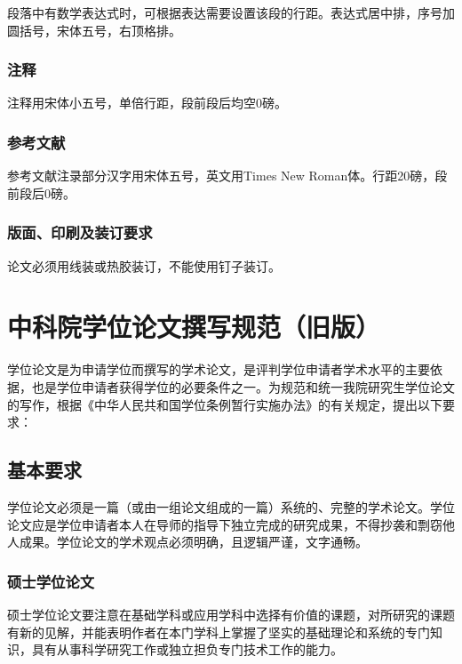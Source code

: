 \documentclass[a4paper,12pt,oneside,openany]{book}
\begin{document}
\begin{CJK}{UTF8}{hei}
段落中有数学表达式时，可根据表达需要设置该段的行距。表达式居中排，序号加圆括号，宋体五号，右顶格排。 


\subsection{注释}

注释用宋体小五号，单倍行距，段前段后均空0磅。


\subsection{参考文献}

参考文献注录部分汉字用宋体五号，英文用Times New Roman体。行距20磅，段前段后0磅。


\subsection{版面、印刷及装订要求}



论文必须用线装或热胶装订，不能使用钉子装订。 

\backmatter





\appendix

\chapter{中科院学位论文撰写规范（旧版）}

学位论文是为申请学位而撰写的学术论文，是评判学位申请者学术水平的主要依据，也是学位申请者获得学位的必要条件之一。为规范和统一我院研究生学位论文的写作，根据《中华人民共和国学位条例暂行实施办法》的有关规定，提出以下要求：


\section{基本要求}

学位论文必须是一篇（或由一组论文组成的一篇）系统的、完整的学术论文。学位论文应是学位申请者本人在导师的指导下独立完成的研究成果，不得抄袭和剽窃他人成果。学位论文的学术观点必须明确，且逻辑严谨，文字通畅。


\subsection{硕士学位论文}

硕士学位论文要注意在基础学科或应用学科中选择有价值的课题，对所研究的课题有新的见解，并能表明作者在本门学科上掌握了坚实的基础理论和系统的专门知识，具有从事科学研究工作或独立担负专门技术工作的能力。


\end{CJK}
\end{document}
